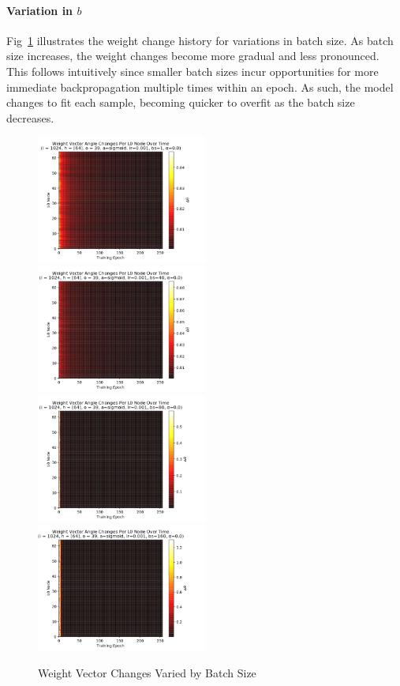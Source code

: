 \documentclass[10pt,epsf]{article}
\begin{document}
{{    \paragraph{Variation in $b$}{
      Fig~\ref{fig:dw-by-b} illustrates the weight change history for variations in batch size.
      As batch size increases, the weight changes become more gradual and less pronounced. This follows
      intuitively since smaller batch sizes incur opportunities for more immediate backpropagation
      multiple times within an epoch. As such, the model changes to fit each sample, becoming quicker
      to overfit as the batch size decreases.
    }
    \begin{figure}[H]
      \includegraphics[width=0.5\textwidth]{./img/64-0.001-1-0-sigmoid-1/weight-angle-changes-L0-255.png}
      \includegraphics[width=0.5\textwidth]{./img/64-0.001-40-0-sigmoid-1/weight-angle-changes-L0-255.png}
      \includegraphics[width=0.5\textwidth]{./img/64-0.001-80-0-sigmoid-1/weight-angle-changes-L0-255.png}
      \includegraphics[width=0.5\textwidth]{./img/64-0.001-160-0-sigmoid-1/weight-angle-changes-L0-255.png}
      \caption{Weight Vector Changes Varied by Batch Size}
      \label{fig:dw-by-b}
    \end{figure}
}}
\end{document}
